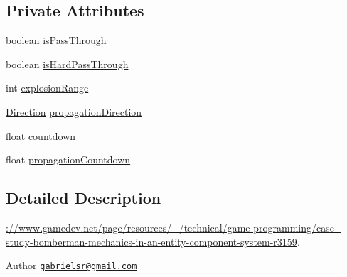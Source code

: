 \subsection*{Private Attributes}
\begin{DoxyCompactItemize}
\item 
boolean \hyperlink{classbr_1_1unb_1_1unbomber_1_1component_1_1_explosion_a09d4a0871d67a4a12a815b354b2272c4}{is\+Pass\+Through}
\item 
boolean \hyperlink{classbr_1_1unb_1_1unbomber_1_1component_1_1_explosion_a222793e61a40380a58bab0be162f3088}{is\+Hard\+Pass\+Through}
\item 
int \hyperlink{classbr_1_1unb_1_1unbomber_1_1component_1_1_explosion_aa8320d23d64b5066cb1c038871d80b90}{explosion\+Range}
\item 
\hyperlink{enumbr_1_1unb_1_1unbomber_1_1component_1_1_direction}{Direction} \hyperlink{classbr_1_1unb_1_1unbomber_1_1component_1_1_explosion_abf7db2b0cd2eeb4358b6732b07d8e3d1}{propagation\+Direction}
\item 
float \hyperlink{classbr_1_1unb_1_1unbomber_1_1component_1_1_explosion_a0b6892a486acfbbc0fc43badd7e76fff}{countdown}
\item 
float \hyperlink{classbr_1_1unb_1_1unbomber_1_1component_1_1_explosion_aafd696323afc7a973bb855591c6da12c}{propagation\+Countdown}
\end{DoxyCompactItemize}


\subsection{Detailed Description}
\hyperlink{}{\+://www.gamedev.\+net/page/resources/\+\_\+/technical/game-\/programming/case -\/study-\/bomberman-\/mechanics-\/in-\/an-\/entity-\/component-\/system-\/r3159}. 

\begin{DoxyAuthor}{Author}
\href{mailto:gabrielsr@gmail.com}{\tt gabrielsr@gmail.\+com} 
\end{DoxyAuthor}


